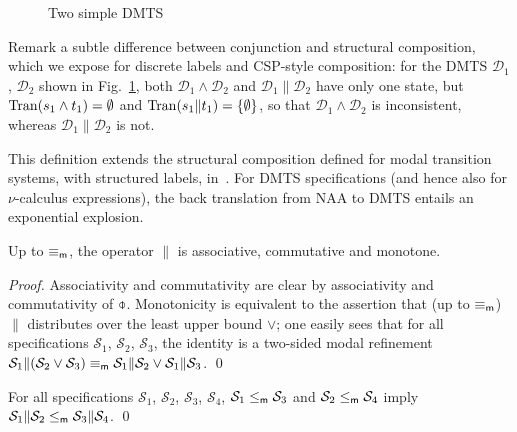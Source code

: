 \documentclass[twocolumn]{svjour3-dummy}
\newcommand*\cD{\mathcal D}
\newcommand*\NAA{NAA\xspace}
\newcommand*\mr{\le_\textup{\textsf{m}}}
\newcommand*\mreq{\equiv_\textup{\textsf{m}}}
\newcommand*\noproof{\qed}
\newcommand*\Tran{\textup{\textrm{Tran}}}
\newcommand*\cS{\mathcal S}
\begin{document}
\begin{figure}
  \centering
  \caption{\label{fi:conjvscomp}
    Two simple DMTS}
\end{figure}

Remark a subtle difference between conjunction and structural
composition, which we expose for discrete labels and CSP-style
composition: for the DMTS $\cD_1$, $\cD_2$ shown in
Fig.~\ref{fi:conjvscomp}, both $\cD_1\land \cD_2$ and $\cD_1\| \cD_2$
have only one state, but $\Tran( s_1\land t_1)= \emptyset$ and $\Tran(
s_1\| t_1)=\{ \emptyset\}$, so that $\cD_1\land \cD_2$ is inconsistent,
whereas $\cD_1\| \cD_2$ is not.

This definition extends the structural composition defined for modal
transition systems, with structured labels,
in~\cite{DBLP:journals/acta/FahrenbergL14}.  For DMTS specifications
(and hence also for $\nu$-calculus expressions), the back translation
from \NAA to DMTS entails an exponential explosion.

\begin{theorem}
  \label{th:comp}
  Up to $\mreq$, the operator $\|$ is associative, commutative and
  monotone.
\end{theorem}

\begin{proof}Associativity and commutativity are clear by associativity and
  commutativity of $\obar$.  Monotonicity is equivalent to the assertion
  that (up to $\mreq$) $\|$ distributes over the least upper bound
  $\lor$; one easily sees that for all specifications $\cS_1$, $\cS_2$,
  $\cS_3$, the identity is a two-sided modal refinement $\cS_1\|(
  \cS_2\lor \cS_3)\mreq \cS_1\| \cS_2\lor \cS_1\| \cS_3$.  \qed
\end{proof}

\begin{corollary}
  \label{co:indimp}
  For all specifications $\cS_1$, $\cS_2$, $\cS_3$, $\cS_4$, $\cS_1\mr
  \cS_3$ and $\cS_2\mr \cS_4$ imply $\cS_1\| \cS_2\mr \cS_3\| \cS_4$.
  \noproof
\end{corollary}
\end{document}
